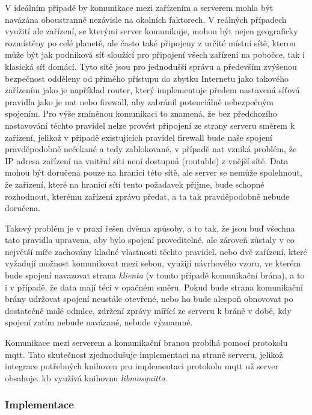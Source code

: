V ideálním případě by komunikace mezi zařízením a serverem mohla být navázána oboustranně nezávisle na okolních faktorech. V reálných případech využití ale zařízení, se kterými server komunikuje, mohou být nejen geograficky rozmístěny po celé planetě, ale často také připojeny z určité místní sítě, kterou může být jak podniková síť sloužící pro připojení všech zařízení na pobočce, tak i klasická síť domácí. Tyto sítě jsou pro jednodušší správu a především zvýšenou bezpečnost odděleny od přímého přístupu do zbytku Internetu jako takového zařízením jako je například router, který implementuje předem nastavená síťová pravidla jako je \acrshort{nat} nebo firewall, aby zabránil potenciálně nebezpečným spojením. Pro výše zmíněnou komunikaci to znamená, že bez předchozího nastavování těchto pravidel nelze provést připojení ze strany serveru směrem k zařízení, jelikož v případě existujících pravidel firewall bude naše spojení pravděpodobně nečekané a tedy zablokované, v případě \acrshort{nat} vzniká problém, že IP adresa zařízení na vnitřní síti není dostupná (routable) z vnější sítě. Data mohou být doručena pouze na hranici této sítě, ale server se nemůže spolehnout, že zařízení, které na hranicí sítí tento požadavek přijme, bude schopné rozhodnout, kterému zařízení zprávu předat, a ta tak pravděpodobně nebude doručena. 

Takový problém je v praxi řešen dvěma způsoby, a to tak, že jsou buď všechna tato pravidla upravena, aby bylo spojení proveditelné, ale zároveň zůstaly v co největší míře zachovány kladné vlastnosti těchto pravidel, nebo dvě zařízení, které vyžadují možnost komunikovat mezi sebou, využijí návrhového vzoru, ve kterém bude spojení navazovat strana \emph{klienta} (v tomto případě komunikační brána), a to i v případě, že data mají téci v opačném směru. Pokud bude strana komunikační brány udržovat spojení neustále otevřené, nebo ho bude alespoň obnovovat po dostatečně malé odmlce, zdržení zprávy mířící ze serveru k bráně v době, kdy spojení zatím nebude navázané, nebude významné.

Komunikace mezi serverem a komunikační branou probíhá pomocí protokolu \acrshort{mqtt}. Tato skutečnost zjednodušuje implementaci na straně serveru, jelikož integrace potřebných knihoven pro implementaci protokolu \acrshort{mqtt} už server obsahuje. \acrshort{kb} využívá knihovnu \emph{libmosquitto}.

\subsubsection{Implementace}

